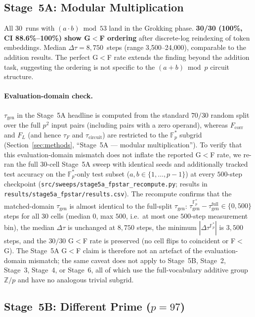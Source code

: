 \documentclass{article}
\newcommand{\taug}{\tau_{\mathrm{gen}}}
\newcommand{\tauf}{\tau_{F}}
\newcommand{\taucirc}{\tau_{\mathrm{circuit}}}
\newcommand{\Dtau}{\Delta\tau}
\newcommand{\fcorr}{F_{\mathrm{corr}}}
\newcommand{\flogit}{F_{L}}
\begin{document}
\subsection{Stage~5A: Modular Multiplication}
\label{sec:results_mul}

All 30~runs with $(a\cdot b)\bmod 53$ land in the Grokking phase.
\textbf{30/30 (100\%, CI 88.6\%--100\%) show G$<$F ordering} after
discrete-log reindexing of token embeddings.
Median $\Dtau = 8{,}750$~steps (range 3{,}500--24{,}000), comparable
to the addition results.
The perfect G$<$F rate extends the finding beyond the addition task,
suggesting the ordering is not specific to the $(a+b)\bmod p$ circuit
structure.

\paragraph{Evaluation-domain check.}
$\taug$ in the Stage~5A headline is computed from the standard
$70/30$ random split over the full $p^{2}$ input pairs (including
pairs with a zero operand), whereas $\fcorr$ and $\flogit$ (and
hence $\tauf$ and $\taucirc$) are restricted to the
$\mathbb{F}_p^*$ subgrid
(Section~\ref{sec:methods}, ``Stage~5A --- modular multiplication'').
To verify that this evaluation-domain mismatch does not inflate
the reported G$<$F rate, we re-ran the full $30$-cell Stage~5A
sweep with identical seeds and additionally tracked test accuracy
on the $\mathbb{F}_p^*$-only test subset
($a, b \in \{1, \dots, p-1\}$) at every $500$-step checkpoint
(\texttt{src/sweeps/stage5a\_fpstar\_recompute.py};
results in \texttt{results/stage5a\_fpstar/results.csv}).
The recompute confirms that the matched-domain $\taug$ is almost
identical to the full-split $\taug$:
$\tau_{\mathrm{gen}}^{\mathbb{F}_p^*}-\tau_{\mathrm{gen}}^{\mathrm{full}}
\in\{0, 500\}$ steps for all $30$ cells (median $0$, max $500$,
i.e.\ at most one $500$-step measurement bin), the median
$\Dtau$ is unchanged at $8{,}750$ steps, the minimum
$|\Dtau^{\mathbb{F}_p^*}|$ is $3{,}500$ steps, and the
$30/30$ G$<$F rate is preserved (no cell flips to coincident or
F$<$G).
The Stage~5A G$<$F claim is therefore not an artefact of the
evaluation-domain mismatch; the same caveat does not apply to
Stage~5B, Stage~2, Stage~3, Stage~4, or Stage~6, all of which use
the full-vocabulary additive group $\mathbb{Z}/p$ and have no
analogous trivial subgrid.

\subsection{Stage~5B: Different Prime (\texorpdfstring{$p{=}97$}{p=97})}
\label{sec:results_p97}
\end{document}
